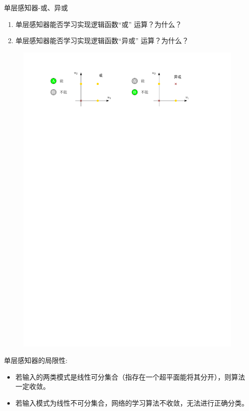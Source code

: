 \begin{example}
    单层感知器-或、异或
    \begin{enumerate}
        \item 单层感知器能否学习实现逻辑函数“或” 运算？为什么？
        \item 单层感知器能否学习实现逻辑函数“异或” 运算？为什么？
    \end{enumerate}
    \begin{figure}[htbp]
        \centering
        \includegraphics{image/单层感知器-或-异或.pdf}
    \end{figure}
\end{example}
\begin{note}
    单层感知器的局限性:
    \begin{itemize}
        \item 若输入的两类模式是线性可分集合（指存在一个超平面能将其分开），则算法一定收敛。
        \item 若输入模式为线性不可分集合，网络的学习算法不收敛，无法进行正确分类。
    \end{itemize}
\end{note}

